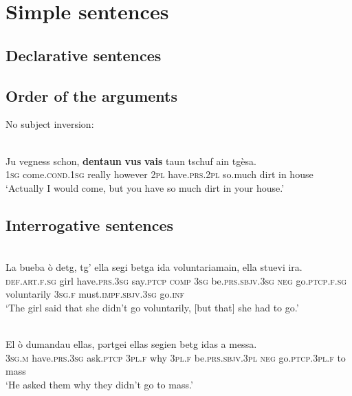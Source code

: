 \chapter{Simple sentences}

\section{Declarative sentences}


\section{Order of the arguments}

No subject inversion:

\ea\label{ex:1:}
 {\citealt[18]{Berther1998}}\\
\gll    Ju vegness schon, \textbf{dentaun} \textbf{vus} \textbf{vais} taun tschuf ain tgèsa.\\
      \textsc{1sg} come.\textsc{cond.1sg} really however \textsc{2pl} have.\textsc{prs.2pl} so.much dirt in house\\
\glt `Actually I would come, but you have so much dirt in your house.'
\z
 

\section{Interrogative sentences}



\ea\label{ex:1:}
 {\citealt[132]{Büchli1966}}\\
\gll    La bueba ò detg, tg' ella segi betga ida voluntariamain, ella stuevi ira.\\
     \textsc{def.art.f.sg} girl have.\textsc{prs.3sg} say.\textsc{ptcp} \textsc{comp}         \textsc{3sg} be.\textsc{prs.sbjv.3sg} \textsc{neg} go.\textsc{ptcp.f.sg} voluntarily      \textsc{3sg.f}  must.\textsc{impf.sbjv.3sg} go.\textsc{inf}\\
\glt `The girl said that she didn't go voluntarily, [but that] she had to go.'
\z
 
    
\ea\label{ex:1:}
 {\citealt[103]{Büchli1966}}\\
\gll    El ò dumandau ellas, pǝrtgei ellas segien betg idas a messa.\\
     \textsc{3sg.m} have.\textsc{prs.3sg} ask.\textsc{ptcp} \textsc{3pl.f} why  \textsc{3pl.f} be.\textsc{prs.sbjv.3pl} \textsc{neg} go.\textsc{ptcp.3pl.f} to mass\\
\glt `He asked them why they didn’t go to mass.'
\z

